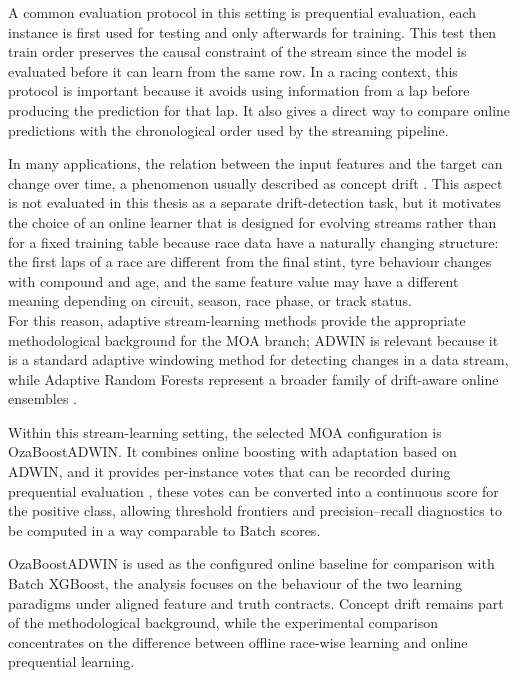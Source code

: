 A common evaluation protocol in this setting is prequential evaluation, each instance is first used for testing and only afterwards for training. This test then train order
preserves the causal constraint of the stream since the model is evaluated before it can learn from the same row. In a racing context, this protocol is important because it avoids
using information from a lap before producing the prediction for that lap. It also gives a direct way to compare online predictions with the chronological order used by the
streaming pipeline.

In many applications, the relation between the input features and the target can
change over time, a phenomenon usually described as concept drift \citep{gama2014drift,arora2024driftreview}. This aspect is not evaluated in this thesis as a separate
drift-detection task, but it motivates the choice of an online learner that is designed for evolving streams rather than for a fixed training table because race data have a
naturally changing structure: the first laps of a race are different from the final stint, tyre behaviour changes with compound and age, and the same feature value may
have a different meaning depending on circuit, season, race phase, or track status.\\
For this reason, adaptive stream-learning methods provide the appropriate methodological background for the MOA branch; ADWIN is relevant because it is a standard adaptive
windowing method for detecting changes in a data stream, while Adaptive Random Forests represent a broader family of drift-aware online ensembles
\citep{bifet2007adwin,gomes2017arf}.

Within this stream-learning setting, the selected MOA configuration is OzaBoostADWIN.
It combines online boosting with adaptation based on ADWIN, and it provides per-instance votes that can be recorded during
prequential evaluation \citep{oza2005boosting,bifet2007adwin}, these votes can be converted into a continuous score for the positive class, allowing
threshold frontiers and precision--recall diagnostics to be computed in a way comparable to Batch scores.

OzaBoostADWIN is used as the configured online baseline for comparison with Batch XGBoost, the analysis focuses on the behaviour of the two learning paradigms under aligned
feature and truth contracts. Concept drift remains part of the methodological background, while the experimental comparison concentrates on the difference between offline
race-wise learning and online prequential learning.


